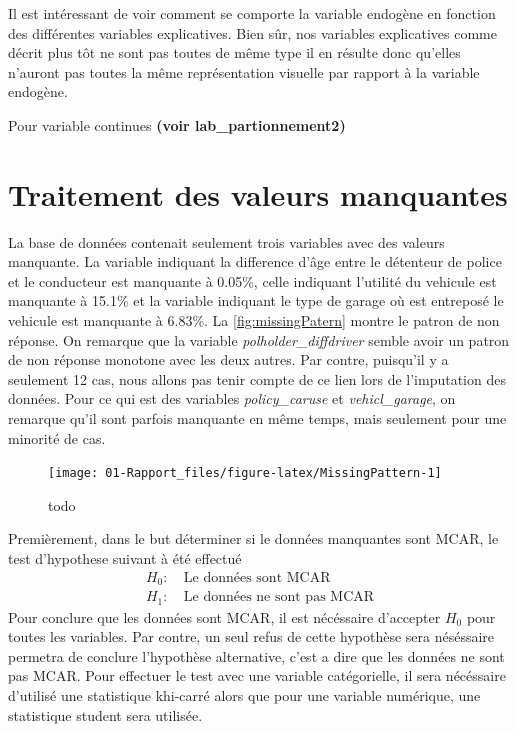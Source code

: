 \documentclass[
]{article}
\begin{document}
Il est intéressant de voir comment se comporte la variable endogène en
fonction des différentes variables explicatives. Bien sûr, nos variables
explicatives comme décrit plus tôt ne sont pas toutes de même type il en
résulte donc qu'elles n'auront pas toutes la même représentation
visuelle par rapport à la variable endogène.

Pour variable continues \textbf{(voir lab\_partionnement2)}

\newpage

\hypertarget{traitement-des-valeurs-manquantes}{%
\section{Traitement des valeurs
manquantes}\label{traitement-des-valeurs-manquantes}}

La base de données contenait seulement trois variables avec des valeurs
manquante. La variable indiquant la difference d'âge entre le détenteur
de police et le conducteur est manquante à 0.05\%, celle indiquant
l'utilité du vehicule est manquante à 15.1\% et la variable indiquant le
type de garage où est entreposé le vehicule est manquante à 6.83\%. La
\autoref{fig:missingPatern} montre le patron de non réponse. On remarque
que la variable \emph{polholder\_diffdriver} semble avoir un patron de
non réponse monotone avec les deux autres. Par contre, puisqu'il y a
seulement 12 cas, nous allons pas tenir compte de ce lien lors de
l'imputation des données. Pour ce qui est des variables
\emph{policy\_caruse} et \emph{vehicl\_garage}, on remarque qu'il sont
parfois manquante en même temps, mais seulement pour une minorité de
cas.

\begin{figure}

{\centering \texttt{[image: 01-Rapport\_files/figure-latex/MissingPattern-1]} 

}

\caption{\label{fig:missingPatern}todo}\label{fig:MissingPattern}
\end{figure}

Premièrement, dans le but déterminer si le données manquantes sont MCAR,
le test d'hypothese suivant à été effectué \begin{align*}
  H_0:&\: \text{Le données sont MCAR} \\
  H_1:&\: \text{Le données ne sont pas MCAR}
\end{align*} Pour conclure que les données sont MCAR, il est nécéssaire
d'accepter \(H_0\) pour toutes les variables. Par contre, un seul refus
de cette hypothèse sera néséssaire permetra de conclure l'hypothèse
alternative, c'est a dire que les données ne sont pas MCAR. Pour
effectuer le test avec une variable catégorielle, il sera nécéssaire
d'utilisé une statistique khi-carré alors que pour une variable
numérique, une statistique student sera utilisée.
\end{document}
